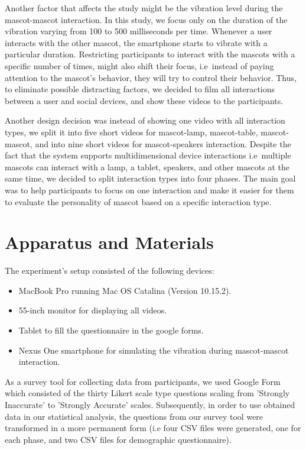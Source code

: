 Another factor that affects the study might be the vibration level during the mascot-mascot interaction.
In this study, we focus only on the duration of the vibration varying from 100 to 500 milliseconds per time.
Whenever a user interacts with the other mascot, the smartphone starts to vibrate with a particular duration.
Restricting participants to interact with the mascots with a specific number of times, might also shift
their focus, i.e\ instead of paying attention to the mascot's behavior, they will try to control their behavior.
Thus, to eliminate possible distracting factors, we decided to film all interactions between a
user and social devices, and show these videos to the participants.

Another design decision was instead of showing one video with all interaction types,
we split it into five short videos for mascot-lamp, mascot-table, mascot-mascot,
and into nine short videos for mascot-speakers interaction.
Despite the fact that the system supports multidimensional device interactions
i.e\ multiple mascots can interact with a lamp, a tablet, speakers, and other mascots at the same time,
we decided to split interaction types into four phases.
The main goal was to help participants to focus on one interaction and make
it easier for them to evaluate the personality of mascot based on a specific interaction type.

\section{Apparatus and Materials}
\label{sec:apparatus-and-materials}
The experiment’s setup consisted of the following devices:
\begin{itemize}
  \item MacBook Pro running Mac OS Catalina (Version 10.15.2).
  \item 55-inch monitor for displaying all videos.
  \item Tablet to fill the questionnaire in the google forms.
  \item Nexus One smartphone for simulating the vibration during mascot-mascot interaction.
\end{itemize}

As a survey tool for collecting data from participants, we used Google Form which consisted
of the thirty Likert scale type questions scaling from 'Strongly Inaccurate' to 'Strongly Accurate' scales.
Subsequently, in order to use obtained data in our statistical analysis, the questions
from our survey tool were transformed in a more permanent form (i.e four CSV files were generated, one for each phase,
and two CSV files for demographic questionnaire).

